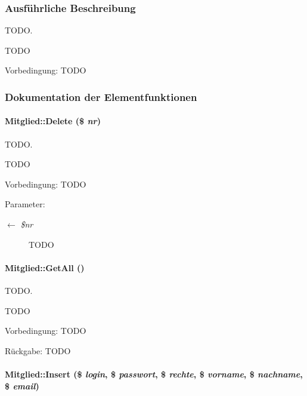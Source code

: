 \subsubsection{Ausf\"{u}hrliche Beschreibung}
TODO. 

TODO \begin{Desc}
\item[Vorbedingung:]TODO \end{Desc}




\subsubsection{Dokumentation der Elementfunktionen}
\hypertarget{classMitglied_c6900c12663e9b228bf9942fc045b8b4}{
\paragraph[Delete]{\setlength{\rightskip}{0pt plus 5cm}Mitglied::Delete (\$ {\em nr})}\hfill}
\label{classMitglied_c6900c12663e9b228bf9942fc045b8b4}


TODO. 

TODO \begin{Desc}
\item[Vorbedingung:]TODO \end{Desc}
\begin{Desc}
\item[Parameter:]
\begin{description}
\item[\mbox{$\leftarrow$} {\em \$nr}]TODO \end{description}
\end{Desc}
\hypertarget{classMitglied_70ce63c9c9a7159966dc9e80a7f726a2}{
\paragraph[GetAll]{\setlength{\rightskip}{0pt plus 5cm}Mitglied::Get\-All ()}\hfill}
\label{classMitglied_70ce63c9c9a7159966dc9e80a7f726a2}


TODO. 

TODO \begin{Desc}
\item[Vorbedingung:]TODO \end{Desc}
\begin{Desc}
\item[R\"{u}ckgabe:]TODO \end{Desc}
\hypertarget{classMitglied_a856527798258505adf9eb08b79fd9fc}{
\paragraph[Insert]{\setlength{\rightskip}{0pt plus 5cm}Mitglied::Insert (\$ {\em login}, \$ {\em passwort}, \$ {\em rechte}, \$ {\em vorname}, \$ {\em nachname}, \$ {\em email})}\hfill}
\label{classMitglied_a856527798258505adf9eb08b79fd9fc}


